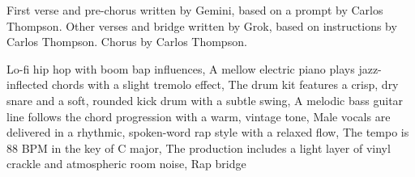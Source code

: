 
\begin{notes}
First verse and pre-chorus written by Gemini, based on a prompt by Carlos Thompson. %
Other verses and bridge written by Grok, based on instructions by Carlos Thompson. %
Chorus by Carlos Thompson.
\end{notes}
\begin{style}
Lo-fi hip hop with boom bap influences, A mellow electric piano plays jazz-inflected chords with a slight tremolo effect, The drum kit features a crisp, dry snare and a soft, rounded kick drum with a subtle swing, A melodic bass guitar line follows the chord progression with a warm, vintage tone, Male vocals are delivered in a rhythmic, spoken-word rap style with a relaxed flow, The tempo is 88 BPM in the key of C major, The production includes a light layer of vinyl crackle and atmospheric room noise, Rap bridge
\end{style}
